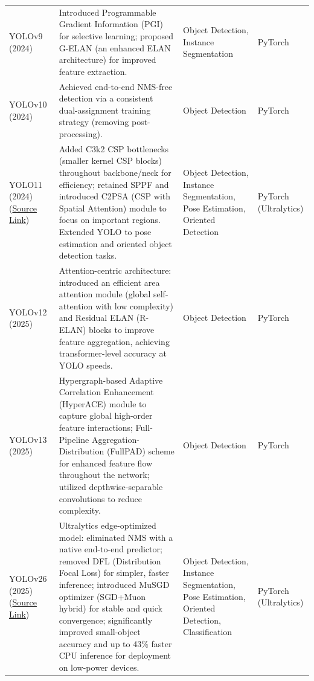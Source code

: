 \documentclass{article}
\begin{document}
\begin{table}[h!]
\begin{tabular}{p{4cm} p{6.5cm} p{2.2cm} p{2cm}}
YOLOv9 (2024) \cite{wang2024yolov9} & Introduced Programmable Gradient Information (PGI) for selective learning; proposed G-ELAN (an enhanced ELAN architecture) for improved feature extraction. & Object Detection, Instance Segmentation & PyTorch \\
YOLOv10 (2024) \cite{wang2024yolov10} & Achieved end-to-end NMS-free detection via a consistent dual-assignment training strategy (removing post-processing). & Object Detection & PyTorch \\
YOLO11 (2024) (\href{https://docs.ultralytics.com/models/yolo11/}{Source Link}) & Added C3k2 CSP bottlenecks (smaller kernel CSP blocks) throughout backbone/neck for efficiency; retained SPPF and introduced C2PSA (CSP with Spatial Attention) module to focus on important regions. Extended YOLO to pose estimation and oriented object detection tasks. & Object Detection, Instance Segmentation, Pose Estimation, Oriented Detection & PyTorch \newline (Ultralytics) \\
YOLOv12 (2025) \cite{tian2025yolov12} & Attention-centric architecture: introduced an efficient area attention module (global self-attention with low complexity) and Residual ELAN (R-ELAN) blocks to improve feature aggregation, achieving transformer-level accuracy at YOLO speeds. & Object Detection & PyTorch \\
YOLOv13 (2025) \cite{lei2025yolov13} & Hypergraph-based Adaptive Correlation Enhancement (HyperACE) module to capture global high-order feature interactions; Full-Pipeline Aggregation-Distribution (FullPAD) scheme for enhanced feature flow throughout the network; utilized depthwise-separable convolutions to reduce complexity. & Object Detection & PyTorch \\
YOLOv26 (2025) (\href{https://docs.ultralytics.com/models/yolo26/}{Source Link}) & Ultralytics edge-optimized model: eliminated NMS with a native end-to-end predictor; removed DFL (Distribution Focal Loss) for simpler, faster inference; introduced MuSGD optimizer (SGD+Muon hybrid) for stable and quick convergence; significantly improved small-object accuracy and up to 43\% faster CPU inference for deployment on low-power devices. & Object Detection, Instance Segmentation, Pose Estimation, Oriented Detection, Classification & PyTorch \newline(Ultralytics) \\
\hline
\end{tabular}
\end{table}
\end{document}
